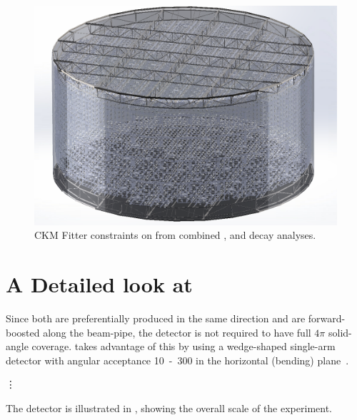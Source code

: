 \begin{figure}
    \includegraphics[width=\largefigwidth]{diagrams/chips/chips_render_2}
    \caption[CKM Fitter constraints on \alphaCKM.]%
    {CKM Fitter constraints on \alphaCKM from combined \BToPiPi,
        \BToRhoPi and \BToRhoRho decay analyses.}
    \label{fig:chips_render_2}
\end{figure}


\section{A Detailed look at \CHIPS}
\label{sec:detailedchips}

Since both  are preferentially produced in the same direction
and are forward-boosted along the beam-pipe, the detector is not required
to have full $4\pi$ solid-angle coverage. \LHCb takes advantage of this
by using a wedge-shaped single-arm detector with angular acceptance
\unit{10-300}{\mrad} in the horizontal (bending) plane~\cite{Amato:1998xt}.

\vspace{1cm}

\begin{center}
    {\hspace{1mm}\Large\vdots\hspace{1cm}}
\end{center}

\vspace{1cm}

The detector is illustrated in , showing
the overall scale of the experiment.


